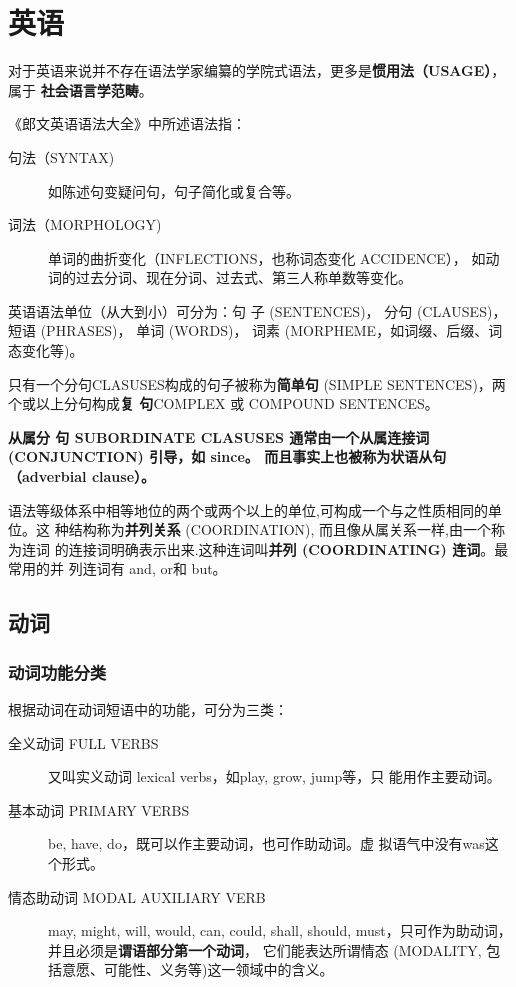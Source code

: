 \chapter{英语}

对于英语来说并不存在语法学家编纂的学院式语法，更多是\textbf{惯用法（USAGE）}，属于
\textbf{社会语言学范畴}。

《郎文英语语法大全》中所述语法指：
\begin{description}
\item [句法（SYNTAX)] 如陈述句变疑问句，句子简化或复合等。
\item [词法（MORPHOLOGY)] 单词的曲折变化（INFLECTIONS，也称词态变化 ACCIDENCE），
  如动词的过去分词、现在分词、过去式、第三人称单数等变化。
\end{description}

英语语法单位（从大到小）可分为：句
子 (SENTENCES)， 分句 (CLAUSES)， 短语 (PHRASES)， 单词 (WORDS)， 词素
(MORPHEME，如词缀、后缀、词态变化等)。

只有一个分句CLASUSES构成的句子被称为\textbf{简单句} (SIMPLE SENTENCES)，两个或以上分句构成\textbf{复
句}COMPLEX 或 COMPOUND SENTENCES。

\textbf{从属分
  句 SUBORDINATE CLASUSES 通常由一个从属连接词 (CONJUNCTION) 引导，如 since。
  而且事实上也被称为状语从句（adverbial clause）。}

语法等级体系中相等地位的两个或两个以上的单位,可构成一个与之性质相同的单位。这
种结构称为\textbf{并列关系} (COORDINATION), 而且像从属关系一样,由一个称为连词
的连接词明确表示出来.这种连词叫\textbf{并列 (COORDINATING) 连词}。最常用的并
列连词有 and, or和 but。


\section{动词}

\subsection{动词功能分类}

根据动词在动词短语中的功能，可分为三类：
\begin{description}
\item[全义动词 FULL VERBS] 又叫实义动词 lexical verbs，如play, grow, jump等，只
  能用作主要动词。
\item[基本动词 PRIMARY VERBS] be, have, do，既可以作主要动词，也可作助动词。虚
  拟语气中没有was这个形式。
\item[情态助动词 MODAL AUXILIARY VERB] may, might, will, would, can, could,
  shall, should, must，只可作为助动词，并且必须是\textbf{谓语部分第一个动词}，
  它们能表达所谓情态 (MODALITY, 包括意愿、可能性、义务等)这一领域中的含义。

\end{description}

